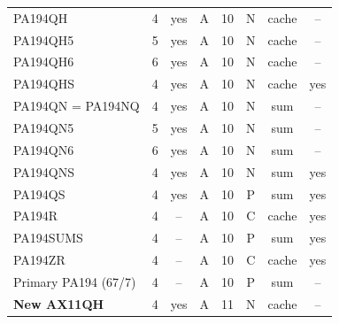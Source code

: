 \begin{longtable}{@{}p{4.15cm}ccccccc@{}}
PA194QH & 4 & yes & A & 10 & N & cache & --\\
PA194QH5 & 5 & yes & A & 10 & N & cache & --\\
PA194QH6 & 6 & yes & A & 10 & N & cache & --\\
PA194QHS & 4 & yes & A & 10 & N & cache & yes\\
PA194QN = PA194NQ & 4 & yes & A & 10 & N & sum & --\\
PA194QN5 & 5 & yes & A & 10 & N & sum & --\\
PA194QN6 & 6 & yes & A & 10 & N & sum & --\\
PA194QNS & 4 & yes & A & 10 & N & sum & yes\\
PA194QS & 4 & yes & A & 10 & P & sum & yes\\
PA194R & 4 & -- & A & 10 & C & cache & yes\\
PA194SUMS & 4 & -- & A & 10 & P & sum & yes\\
PA194ZR & 4 & -- & A & 10 & C & cache & yes\\
Primary PA194 (67/7) & 4 & -- & A & 10 & P & sum & --\\
\midrule\textbf{New AX11QH} & 4 & yes & A & 11 & N & cache & --\\
\end{longtable}
\normalsize
